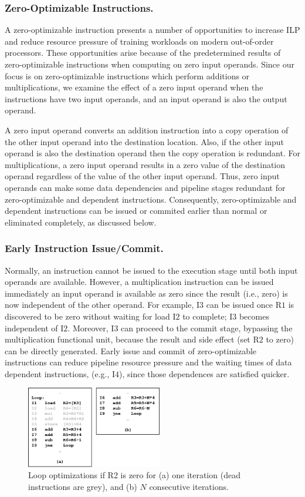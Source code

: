 \subsubsection{Zero-Optimizable Instructions.} A zero-optimizable instruction presents a number of opportunities to increase ILP and reduce resource pressure of training workloads on modern out-of-order processors.  These opportunities arise because of the predetermined results of zero-optimizable instructions when computing on zero input operands.  Since our focus is on zero-optimizable instructions which perform additions or multiplications, we examine the effect of a zero input operand when the instructions have two input operands, and an input operand is also the output operand. 

A zero input operand converts an addition instruction into a copy operation of the other input operand into the destination location. Also, if the other input operand is also the destination operand then the copy operation is redundant.  For multiplications, a zero input operand results in a zero value of the destination operand regardless of the value of the other input operand.  Thus, zero input operands can make some data dependencies and pipeline stages redundant for zero-optimizable and dependent instructions.  Consequently, zero-optimizable and dependent instructions can be issued or commited earlier than normal or eliminated completely, as discussed below. 

\subsubsection{Early Instruction Issue/Commit.}  Normally, an instruction cannot be issued to the execution stage until both input operands are available. However, a multiplication instruction can be issued immediately an input operand is available as zero since the result (i.e., zero) is now independent of the other operand.  For example, I$3$ can be issued once R$1$ is discovered to be zero without waiting for load I$2$ to complete; I$3$ becomes independent of I$2$.  Moreover, I$3$ can proceed to the commit stage, bypassing the multiplication functional unit, because the result and side effect (set R$2$ to zero)  can be directly generated.  Early issue and commit of zero-optimizable instructions can reduce pipeline resource pressure and the waiting times of data dependent instructions, (e.g., I$4$), since those dependences are satisfied quicker. 

\begin{figure}
\centering
\includegraphics[height=1.4in, width=.9\columnwidth]{Figures/r2_deltas_opts.png}
\caption{Loop optimizations if R2 is zero for (a) one iteration (dead instructions are grey), and (b) $N$ consecutive iterations.}
\label{fig:r2_deltas_opts}
\end{figure}

